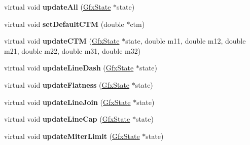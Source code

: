 \begin{DoxyCompactItemize}
\item 
\mbox{\label{class_cairo_image_output_dev_a09db7dc754ea7fa29f1653900d2f3a25}} 
virtual void {\bfseries update\+All} (\hyperlink{class_gfx_state}{Gfx\+State} $\ast$state)
\item 
\mbox{\label{class_cairo_image_output_dev_a896db42cd40d6b86393cbd8e425bf344}} 
virtual void {\bfseries set\+Default\+C\+TM} (double $\ast$ctm)
\item 
\mbox{\label{class_cairo_image_output_dev_a165afb34d2fc4a43416009e2ffe19a4b}} 
virtual void {\bfseries update\+C\+TM} (\hyperlink{class_gfx_state}{Gfx\+State} $\ast$state, double m11, double m12, double m21, double m22, double m31, double m32)
\item 
\mbox{\label{class_cairo_image_output_dev_a44a7aa7b5e061f8a36d66762f017e003}} 
virtual void {\bfseries update\+Line\+Dash} (\hyperlink{class_gfx_state}{Gfx\+State} $\ast$state)
\item 
\mbox{\label{class_cairo_image_output_dev_a9cec1a8feb681826cd448a62a71ed74b}} 
virtual void {\bfseries update\+Flatness} (\hyperlink{class_gfx_state}{Gfx\+State} $\ast$state)
\item 
\mbox{\label{class_cairo_image_output_dev_ade5962436f6721a572ce72036d231558}} 
virtual void {\bfseries update\+Line\+Join} (\hyperlink{class_gfx_state}{Gfx\+State} $\ast$state)
\item 
\mbox{\label{class_cairo_image_output_dev_ad5212750ead7fbf98f7e9c8cf3d0bcae}} 
virtual void {\bfseries update\+Line\+Cap} (\hyperlink{class_gfx_state}{Gfx\+State} $\ast$state)
\item 
\mbox{\label{class_cairo_image_output_dev_a7aece9213f7c778d2fd3cefa84edd862}} 
virtual void {\bfseries update\+Miter\+Limit} (\hyperlink{class_gfx_state}{Gfx\+State} $\ast$state)
\item 
\mbox{\label{class_cairo_image_output_dev_a57f8c64c66560eb84ffa8a83aae863f3}} 

\end{DoxyCompactItemize}
